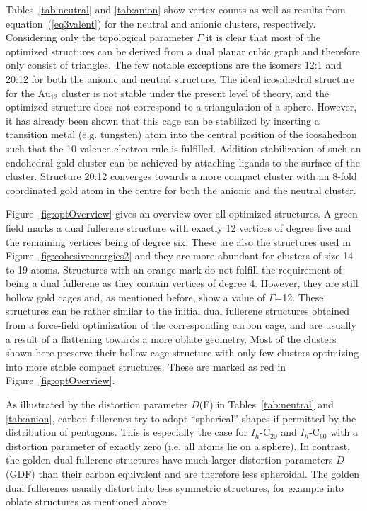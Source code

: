 Tables~\ref{tab:neutral} and \ref{tab:anion} show vertex counts as well as
results from equation~(\ref{eq3valent}) for the neutral and anionic clusters,
respectively. Considering only the topological parameter $\Gamma$ it is clear that most of the optimized
structures can be derived from a dual planar cubic graph and therefore only
consist of triangles. The few notable exceptions are the isomers 12:1 and 20:12 for
both the anionic and neutral structure. The ideal icosahedral structure for the
Au$_{12}$ cluster is not stable under the present level of theory, and the optimized
structure does not correspond to a triangulation of a sphere. However, it has
already been shown that this cage can
be stabilized by inserting a transition metal (e.g. tungsten) atom into the central position
of the icosahedron such that the 10 valence electron rule is
fulfilled.\autocite{Pyykko_IcosahedralWAu12Predicted_2002,Autschbach_PropertiesWAu12_2004} Addition stabilization of such
an endohedral gold cluster can be achieved by attaching ligands to the surface
of the cluster.\autocite{Laupp-1994} Structure 20:12 converges
towards a more compact cluster with an 8-fold coordinated gold atom in the centre
for both the anionic and the neutral cluster.  

Figure~\ref{fig:optOverview} gives an overview over all optimized structures. 
A green field marks a dual fullerene structure with
exactly 12 vertices of degree five and the remaining vertices being of degree
six. These are also the structures used in Figure~\ref{fig:cohesiveenergies2}
and they are more abundant for clusters of size 14 to 19 atoms. Structures with an
orange mark do not fulfill the requirement of being a dual fullerene as they contain
vertices of degree 4. However,
they are still hollow gold cages and, as mentioned before, show a value of
$\Gamma$=12. These structures can be rather similar to the initial dual fullerene
structures obtained from a force-field optimization of the corresponding carbon cage,
and are usually a result of a flattening towards a more oblate geometry. 
Most of the clusters shown here preserve their hollow cage structure 
with only few clusters optimizing into more stable compact structures. These
are marked as red in Figure~\ref{fig:optOverview}.


As illustrated by the distortion parameter $D$(F) in Tables~\ref{tab:neutral} and
\ref{tab:anion}, carbon fullerenes try to adopt ``spherical'' shapes if permitted
by the distribution of pentagons. This is especially the case for $I_h$-C$_{20}$
and $I_h$-C$_{60}$ with a distortion parameter of exactly zero (i.e. all atoms lie on a sphere). 
In contrast, the golden dual fullerene structures have much larger distortion parameters $D$(GDF) than their
carbon equivalent and are therefore less spheroidal. The golden dual fullerenes usually distort
into less symmetric structures, for example into oblate structures as mentioned above.

